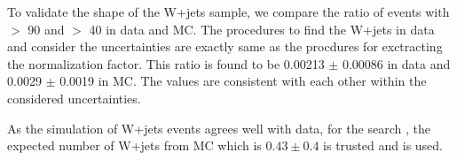 To validate the shape of the W+jets sample, we compare the ratio of events with \mttwo $>$ 90 \GeV and  \mttwo $>$ 40 \GeV in data and MC.
The procedures to find the W+jets in data and consider the uncertainties are exactly same as the procdures for exctracting the normalization  
factor. This ratio is found to be 0.00213 $\pm$ 0.00086 in data and  0.0029 $\pm$ 0.0019 in MC. The values are consistent with each other within 
the considered uncertainties.

As the simulation of W+jets events agrees well with data, for the search \bintwo, the expected number of W+jets from MC which is $0.43\pm0.4$ is trusted and is used.

